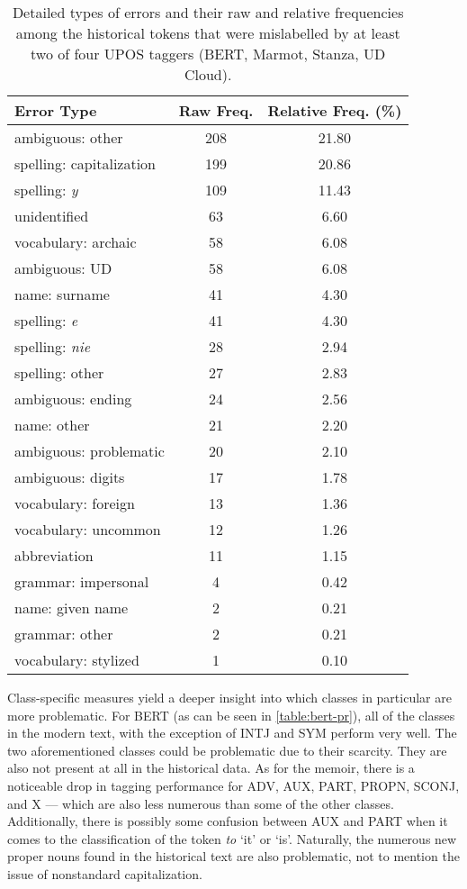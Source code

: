 \renewcommand{\arraystretch}{1.25}
\begin{table}[H]
\begin{center}
\begin{tabular}{|l|cc|}
\hline \bf Error Type & \bf Raw Freq. & \bf Relative Freq. (\%) \\ \hline
ambiguous: other & 208 & 21.80 \\
spelling: capitalization & 199 & 20.86 \\
spelling: \textit{y} & 109 & 11.43  \\
unidentified & 63 & 6.60 \\
vocabulary: archaic & 58 & 6.08 \\
ambiguous: UD & 58 & 6.08 \\
name: surname & 41 & 4.30 \\
spelling: \textit{e} & 41 & 4.30 \\
spelling: \textit{nie} & 28 & 2.94 \\
spelling: other & 27 & 2.83 \\
ambiguous: ending & 24 & 2.56 \\
name: other & 21 & 2.20 \\
ambiguous: problematic & 20 & 2.10 \\
ambiguous: digits & 17 & 1.78 \\
vocabulary: foreign & 13 & 1.36 \\
vocabulary: uncommon & 12 & 1.26 \\
abbreviation & 11 & 1.15 \\
grammar: impersonal & 4 & 0.42 \\
name: given name & 2 & 0.21 \\
grammar: other & 2 & 0.21 \\
vocabulary: stylized & 1 & 0.10 \\
\hline
\end{tabular}
\caption{\label{table:pos-errors} Detailed types of errors and their raw and relative frequencies among the historical tokens that were mislabelled by at least two of four UPOS taggers (BERT, Marmot, Stanza, UD Cloud).}
\end{center}
\end{table}

Class-specific measures yield a deeper insight into which classes in particular are more problematic. For BERT (as can be seen in \autoref{table:bert-pr}), all of the classes in the modern text, with the exception of INTJ and SYM perform very well. The two aforementioned classes could be problematic due to their scarcity. They are also not present at all in the historical data. As for the memoir, there is a noticeable drop in tagging performance for ADV, AUX, PART, PROPN, SCONJ, and X --- which are also less numerous than some of the other classes. Additionally, there is possibly some confusion between AUX and PART when it comes to the classification of the token \textit{to} `it' or `is'. Naturally, the numerous new proper nouns found in the historical text are also problematic, not to mention the issue of nonstandard capitalization. 

